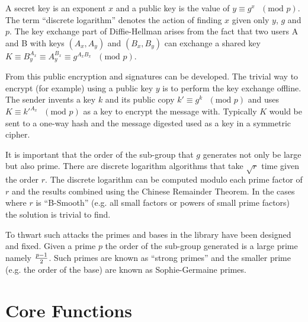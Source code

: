 \documentclass{book}
\begin{document}
A secret key is an exponent $x$ and a public key is the value of $y \equiv g^x\mbox{ }(\mbox{mod }p)$.  The term
``discrete logarithm'' denotes the action of finding $x$ given only $y$, $g$ and $p$.  The key exchange part of
Diffie-Hellman arises from the fact that two users A and B with keys $(A_x, A_y)$ and $(B_x, B_y)$ can exchange 
a shared key $K \equiv B_y^{A_x} \equiv A_y^{B_x} \equiv g^{A_xB_x}\mbox{ }(\mbox{mod }p)$.

From this public encryption and signatures can be developed.  The trivial way to encrypt (for example) using a public key 
$y$ is to perform the key exchange offline.  The sender invents a key $k$ and its public copy 
$k' \equiv g^k\mbox{ }(\mbox{mod }p)$ and uses $K \equiv k'^{A_x}\mbox{ }(\mbox{mod }p)$ as a key to encrypt
the message with.  Typically $K$ would be sent to a one-way hash and the message digested used as a key in a 
symmetric cipher.

It is important that the order of the sub-group that $g$ generates not only be large but also prime.  There are
discrete logarithm algorithms that take $\sqrt r$ time given the order $r$.  The discrete logarithm can be computed
modulo each prime factor of $r$ and the results combined using the Chinese Remainder Theorem.  In the cases where 
$r$ is ``B-Smooth'' (e.g. all small factors or powers of small prime factors) the solution is trivial to find.

To thwart such attacks the primes and bases in the library have been designed and fixed.  Given a prime $p$ the order of
 the sub-group generated is a large prime namely ${p - 1} \over 2$.  Such primes are known as ``strong primes'' and the 
smaller prime (e.g. the order of the base) are known as Sophie-Germaine primes.

\section{Core Functions}
\end{document}

